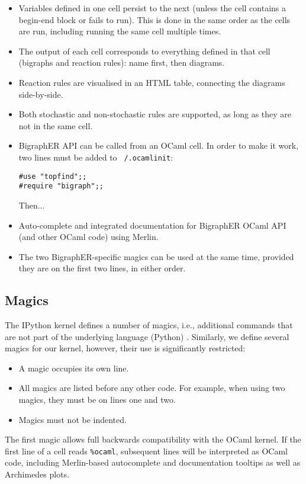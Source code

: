 \documentclass{article}
\begin{document}
\begin{itemize}
\item Variables defined in one cell persist to the next (unless the cell
  contains a begin-end block or fails to run). This is done in the same order as
  the cells are run, including running the same cell multiple times.
\item The output of each cell corresponds to everything defined in that cell
  (bigraphs and reaction rules): name first, then diagrams.
\item Reaction rules are visualised in an HTML table, connecting the diagrams
  side-by-side.
\item Both stochastic and non-stochastic rules are supported, as long as they
  are not in the same cell.
\item BigraphER API can be called from an OCaml cell. In order to make it work,
  two lines must be added to \texttt{~/.ocamlinit}:
  \begin{lstlisting}
#use "topfind";;
#require "bigraph";;
  \end{lstlisting}
  Then... %
\item Auto-complete and integrated documentation for BigraphER OCaml API (and
  other OCaml code) using Merlin.
\item The two BigraphER-specific magics can be used at the same time, provided
  they are on the first two lines, in either order.
\end{itemize}

\subsection{Magics}

The IPython kernel defines a number of magics, i.e., additional commands that
are not part of the underlying language (Python) \cite{website:magic}.
Similarly, we define several magics for our kernel, however, their use is
significantly restricted:
\begin{itemize}
\item A magic occupies its own line.
\item All magics are listed before any other code. For example, when using two
  magics, they must be on lines one and two.
\item Magics must not be indented.
\end{itemize}

The first magic allows full backwards compatibility with the OCaml kernel. If
the first line of a cell reads \texttt{\%ocaml}, subsequent lines will be
interpreted as OCaml code, including Merlin-based autocomplete and documentation
tooltips as well as Archimedes plots.
\end{document}
